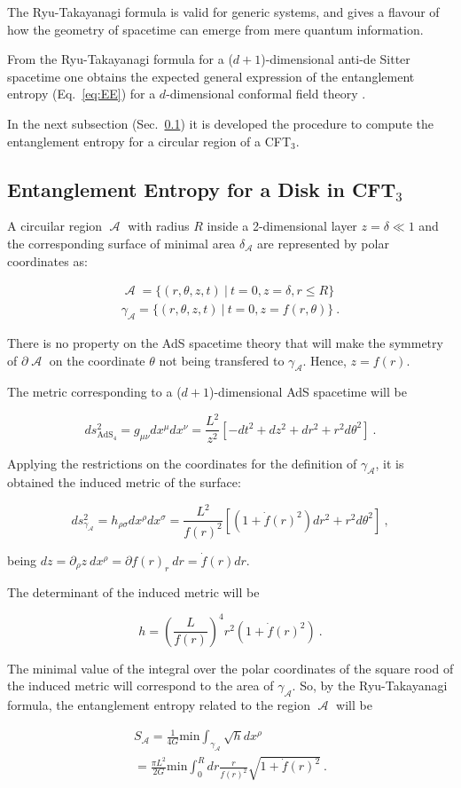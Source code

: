 \documentclass[twocolumn]{revtex4}
\providecommand{\eq}[2]{
    \begin{equation}
        #2
    \label{eq:#1}
    \end{equation}
}
\providecommand{\eqgat}[2]{
    \begin{gather}
        #2
    \label{eq:#1}
    \end{gather}
}
\DeclareMathOperator{\calA}{\mathcal{A}}
\begin{document}
The Ryu-Takayanagi formula is valid for generic systems, and gives a flavour of how the geometry of spacetime can emerge from mere quantum information. 

From the Ryu-Takayanagi formula for a ($d+1$)-dimensional anti-de Sitter spacetime one obtains the expected general expression of the entanglement entropy (Eq.~\ref{eq:EE}) for a $d$-dimensional conformal field theory \cite{}.

In the next subsection (Sec.~\ref{ss:EE-disk}) it is developed the procedure to compute the entanglement entropy for a circular region of a CFT$_3$.


\subsection{Entanglement Entropy for a Disk in CFT$_3$} \label{ss:EE-disk}

A circuilar region $\calA$ with radius $R$ inside a 2-dimensional layer $z = \delta \ll 1$ and the corresponding surface of minimal area $\delta_{\calA}$ are represented by polar coordinates as:
\eqgat{1A}{
    \calA = \{ ( r, \theta, z, t ) \ | \ t = 0, z = \delta, r \le R \} \nonumber \\
    \gamma_{\calA} = \{ ( r, \theta, z, t ) \ | \ t = 0, z = f (r, \theta) \} \ .
}
There is no property on the AdS spacetime theory that will make the symmetry of $\partial \calA$ on the coordinate $\theta$ not being transfered to $\gamma_{\calA}$. Hence, $z = f (r)$.

The metric corresponding to a ($d+1$)-dimensional AdS spacetime will be
\eq{1Ametric}{
    ds^2_{\text{AdS}_4} = g_{\mu \nu} dx^\mu dx^\nu = 
    \frac{L^2}{z^2} [ -dt^2 + dz^2 + dr^2 + r^2 d\theta^2 ] \ .
}

Applying the restrictions on the coordinates for the definition of $\gamma_{\calA}$, it is obtained the induced metric of the surface:
\eq{1gammaAmetric}{
    ds^2_{\gamma_{\calA}} = h_{\rho \sigma} dx^\rho dx^\sigma = 
    \frac{L^2}{f(r)^2} \left[ \left( 1+ \dot{f}(r)^2 \right) dr^2 + r^2 d\theta^2 \right] \ ,
}
being $dz = \partial_\rho z \ dx^\rho = \partial f(r)_r \ dr = \dot{f}(r) dr$.

The determinant of the induced metric will be
\eq{1h}{
    h = \left( \frac{L}{f(r)} \right) ^4 r^2 ( 1 + \dot{f}(r)^2 ) \ .
}

The minimal value of the integral over the polar coordinates of the square rood of the induced metric will correspond to the area of $\gamma_{\calA}$. So, by the Ryu-Takayanagi formula, the entanglement entropy related to the region $\calA$ will be
\eqgat{1EEA}{
    S_{\calA} = \frac{1}{4G} \text{min} \int_{\gamma_{\calA}} \sqrt{h} dx^\rho \nonumber \\
    = \frac{\pi L^2}{2G} \text{min} \int_0^R dr \frac{r}{f(r)^2} \sqrt{ 1 + \dot{f}(r)^2 } \ .
}
\end{document}
